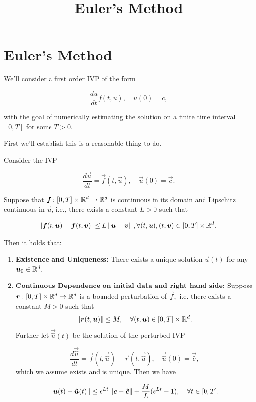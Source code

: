 \documentclass{article}
\title{Euler's Method}
\begin{document}
\section{Euler's Method}

We'll consider a first order IVP of the form

\[ \frac{du}{dt} f(t, u), \quad u(0) = c, \]

with the goal of numerically estimating the solution on a finite time interval $[0, T]$ for some $T > 0.$

First we'll establish this is a reasonable thing to do.

\begin{theorem}
Consider the IVP

	\[ \frac{d\vec{u}}{dt} = \vec{f}(t, \vec{u}), \quad \vec{u}(0) = \vec{c}. \]

	Suppose that $\boldsymbol{f}: [0, T] \times \mathbb{R}^d \to \mathbb{R}^d$ is \@{continuous} in its \@{domain} and \@{Lipschitz continuous} in $\vec{u}$, i.e., there exists a constant $L > 0$ such that

	\[ \left| \boldsymbol{f}(t, \boldsymbol{u}) - \boldsymbol{f}(t, \boldsymbol{v}) \right| \leq L\left\lVert \boldsymbol{u} - \boldsymbol{v} \right\rVert, \forall(t, \boldsymbol{u}), (t, \boldsymbol{v}) \in [0, T] \times \mathbb{R}^d. \]

	Then it holds that:

	\begin{enumerate}
	        \item \textbf{Existence and Uniqueness:} There exists a unique solution $\vec{u}(t)$ for any $\boldsymbol{u}_0 \in \mathbb{R}^d.$
		\item \textbf{Continuous Dependence on initial data and right hand side:} Suppose $\boldsymbol{r} : [0,T] \times \mathbb{R}^d \to \mathbb{R}^d$ is a bounded \@{perturbation} of $\vec{f},$ i.e. there exists a constant $M > 0$ such that
			\[ \left\lVert \boldsymbol{r}(t, \boldsymbol{u}) \right\rVert \leq M, \quad \forall(t, \boldsymbol{u}) \in [0, T] \times \mathbb{R}^d. \]
			Further let $\vec{\hat{u}}(t)$ be the solution of the perturbed IVP

			\[ \frac{d \vec{\hat{u}}}{dt} = \vec{f}(t, \vec{\hat{u}}) + \vec{r}(t, \vec{\hat{u}}), \quad \vec{\hat{u}}(0) = \vec{\hat{c}},  \]
			which we assume exists and is unique. Then we have

			\[ \left\lVert \boldsymbol{u}(t) - \boldsymbol{\hat{u}}(t) \right\rVert \leq e^{Lt} \left\lVert \boldsymbol{c} - \boldsymbol{\hat{c}} \right\rVert + \frac{M}{L}(e^{Lt} - 1), \quad \forall t \in [0, T]. \]
	\end{enumerate}

\end{theorem}
\end{document}
